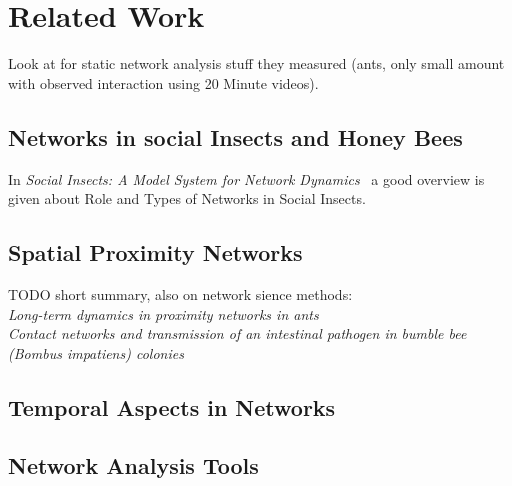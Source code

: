 \chapter{Related Work}
\label{ch:relatedwork}

Look at \cite{quevillon2015social} for static network analysis stuff they measured (ants, only small amount with observed interaction using 20 Minute videos).

\section{Networks in social Insects and Honey Bees}

In \emph{Social Insects: A Model System for Network Dynamics}~\cite{charbonneau2013social} a good overview is given about Role and Types of Networks in Social Insects.

\section{Spatial Proximity Networks}

TODO short summary, also on network sience methods:\\
\emph{Long-term dynamics in proximity networks in ants}~\cite{jeanson2012long}\\

\emph{Contact networks and transmission of an intestinal pathogen in bumble bee (Bombus impatiens) colonies}~\cite{otterstatter2007contact}

\section{Temporal Aspects in Networks}

\section{Network Analysis Tools}
